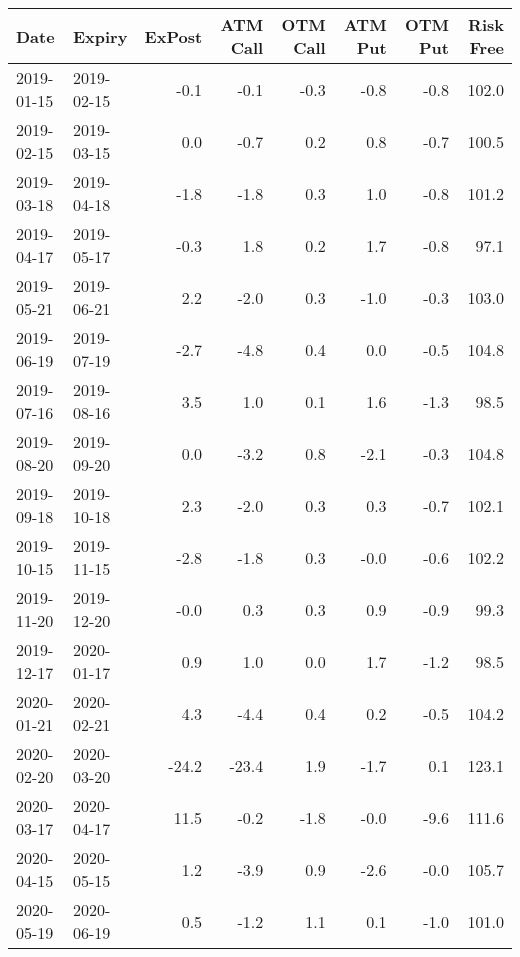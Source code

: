 \begin{tabular}{llrrrrrr}
\hline
 Date       & Expiry     &   ExPost &   ATM Call &   OTM Call &   ATM Put &   OTM Put &   Risk Free \\
\hline
 2019-01-15 & 2019-02-15 &     -0.1 &       -0.1 &       -0.3 &      -0.8 &      -0.8 &       102.0 \\
 2019-02-15 & 2019-03-15 &      0.0 &       -0.7 &        0.2 &       0.8 &      -0.7 &       100.5 \\
 2019-03-18 & 2019-04-18 &     -1.8 &       -1.8 &        0.3 &       1.0 &      -0.8 &       101.2 \\
 2019-04-17 & 2019-05-17 &     -0.3 &        1.8 &        0.2 &       1.7 &      -0.8 &        97.1 \\
 2019-05-21 & 2019-06-21 &      2.2 &       -2.0 &        0.3 &      -1.0 &      -0.3 &       103.0 \\
 2019-06-19 & 2019-07-19 &     -2.7 &       -4.8 &        0.4 &       0.0 &      -0.5 &       104.8 \\
 2019-07-16 & 2019-08-16 &      3.5 &        1.0 &        0.1 &       1.6 &      -1.3 &        98.5 \\
 2019-08-20 & 2019-09-20 &      0.0 &       -3.2 &        0.8 &      -2.1 &      -0.3 &       104.8 \\
 2019-09-18 & 2019-10-18 &      2.3 &       -2.0 &        0.3 &       0.3 &      -0.7 &       102.1 \\
 2019-10-15 & 2019-11-15 &     -2.8 &       -1.8 &        0.3 &      -0.0 &      -0.6 &       102.2 \\
 2019-11-20 & 2019-12-20 &     -0.0 &        0.3 &        0.3 &       0.9 &      -0.9 &        99.3 \\
 2019-12-17 & 2020-01-17 &      0.9 &        1.0 &        0.0 &       1.7 &      -1.2 &        98.5 \\
 2020-01-21 & 2020-02-21 &      4.3 &       -4.4 &        0.4 &       0.2 &      -0.5 &       104.2 \\
 2020-02-20 & 2020-03-20 &    -24.2 &      -23.4 &        1.9 &      -1.7 &       0.1 &       123.1 \\
 2020-03-17 & 2020-04-17 &     11.5 &       -0.2 &       -1.8 &      -0.0 &      -9.6 &       111.6 \\
 2020-04-15 & 2020-05-15 &      1.2 &       -3.9 &        0.9 &      -2.6 &      -0.0 &       105.7 \\
 2020-05-19 & 2020-06-19 &      0.5 &       -1.2 &        1.1 &       0.1 &      -1.0 &       101.0 \\

\end{tabular}

